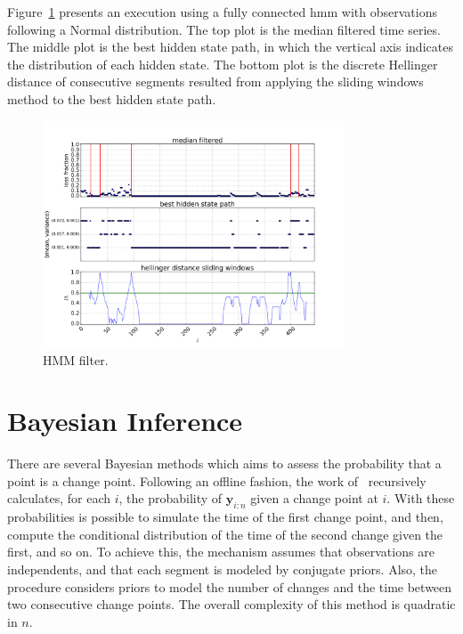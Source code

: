 Figure~\ref{fig:hmm_filter} presents an execution using a fully connected \gls*{hmm}
with observations following a Normal distribution.
The top plot is the median filtered time series.
The middle plot is the best hidden state path, in which the vertical axis
indicates the distribution of each hidden state.
The bottom plot is the discrete Hellinger distance of consecutive segments
resulted from applying the sliding windows method to the best hidden state path.

\begin{figure}[H]
    \centering
    \includegraphics[width=0.8\textwidth]{./figures/change_point_detection/gaussian_hmm/id115_serverRJODTCLDM031_mac64:66:B3:7B:A1:B8_dtstart2016-05-01_dtend2016-05-11.png}
    \caption{HMM filter.}
\label{fig:hmm_filter}
\end{figure}%

\section{Bayesian Inference}

There are several Bayesian methods which aims to assess the probability that a
point is a change point. Following an offline fashion, the work
of~\cite{exact_and_efficient_bayesian_inference_for_multiple_changepoint_problems}
recursively calculates, for each $i$, the probability of $\mathbf{y}_{i : n}$
given a change point at $i$. With these probabilities is possible to simulate
the time of the first change point, and then, compute the conditional
distribution of the time of the second change given the first, and so on. To
achieve this, the mechanism assumes that observations are independents, and that
each segment is modeled by conjugate priors. Also, the procedure considers
priors to model the number of changes and the time between two consecutive
change points. The overall complexity of this method is quadratic in $n$.

